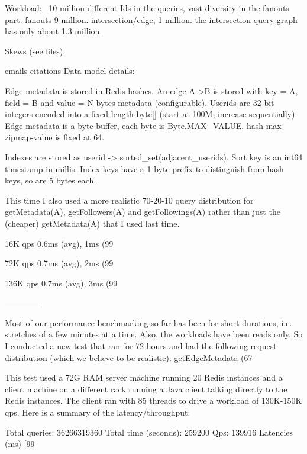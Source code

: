 \documentclass{article}
\begin{document}
Workload:
~10 million different Ids in the queries, vast diversity in the fanouts part.
fanouts 9 million. intersection/edge, 1 million.
the intersection query graph has only about 1.3 million.

Skews (see files).

emails citations
Data model details:

Edge metadata is stored in Redis hashes. An edge A->B is stored with key = A, field = B and value = N bytes metadata (configurable). Userids are 32 bit integers encoded into a fixed length byte[] (start at 100M, increase sequentially). Edge metadata is a byte buffer, each byte is Byte.MAX_VALUE. hash-max-zipmap-value is fixed at 64.

Indexes are stored as userid -> sorted_set(adjacent_userids). Sort key is an int64 timestamp in millis. Index keys have a 1 byte prefix to distinguish from hash keys, so are 5 bytes each.

This time I also used a more realistic 70-20-10 query distribution for getMetadata(A), getFollowers(A) and getFollowings(A) rather than just the (cheaper) getMetadata(A) that I used last time.

16K qps
0.6ms (avg), 1ms (99%

72K qps
0.7ms (avg), 2ms (99%

136K qps
0.7ms (avg), 3ms (99%

-------------

Most of our performance benchmarking so far has been for short durations, i.e. stretches of a few minutes at a time. Also, the workloads have been reads only. So I conducted a new test that ran for 72 hours and had the following request distribution (which we believe to be realistic): getEdgeMetadata (67%

This test used a 72G RAM server machine running 20 Redis instances and a client machine on a different rack running a Java client talking directly to the Redis instances. The client ran with 85 threads to drive a workload of 130K-150K qps. Here is a summary of the latency/throughput:

Total queries: 36266319360
Total time (seconds): 259200
Qps: 139916
Latencies (ms) [99%
\end{document}
